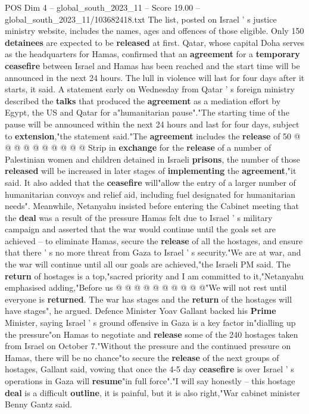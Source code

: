 \begin{textsample}{POS Dim 4 – global\_south\_2023\_11 – Score 19.00 – global\_south\_2023\_11/103682418.txt}
The list, posted on Israel ' s justice ministry website, includes the names, ages and offences of those eligible.
Only 150 \textbf{detainees} are expected to be \textbf{released} at first.
Qatar, whose capital Doha serves as the headquarters for Hamas, confirmed that an \textbf{agreement} for a \textbf{temporary} \textbf{ceasefire} between Israel and Hamas has been reached and the start time will be announced in the next 24 hours.
The lull in violence will last for four days after it starts, it said.
A statement early on Wednesday from Qatar ' s foreign ministry described the \textbf{talks} that produced the \textbf{agreement} as a mediation effort by Egypt, the US and Qatar for a"humanitarian pause"."The starting time of the pause will be announced within the next 24 hours and last for four days, subject to \textbf{extension},"the statement said."The \textbf{agreement} includes the \textbf{release} of 50 @ @ @ @ @ @ @ @ @ @ Strip in \textbf{exchange} for the \textbf{release} of a number of Palestinian women and children detained in Israeli \textbf{prisons}, the number of those \textbf{released} will be increased in later stages of \textbf{implementing} the \textbf{agreement},"it said.
It also added that the \textbf{ceasefire} will"allow the entry of a larger number of humanitarian convoys and relief aid, including fuel designated for humanitarian needs".
Meanwhile, Netanyahu insisted before entering the Cabinet meeting that the \textbf{deal} was a result of the pressure Hamas felt due to Israel ' s military campaign and asserted that the war would continue until the goals set are achieved -- to eliminate Hamas, secure the \textbf{release} of all the hostages, and ensure that there ' s no more threat from Gaza to Israel ' s security."We are at war, and the war will continue until all our goals are achieved,"the Israeli PM said.
The \textbf{return} of hostages is a top,"sacred priority and I am committed to it,"Netanyahu emphasised adding,"Before us @ @ @ @ @ @ @ @ @ @"We will not rest until everyone is \textbf{returned}.
The war has stages and the \textbf{return} of the hostages will have stages", he argued.
Defence Minister Yoav Gallant backed his \textbf{Prime} Minister, saying Israel ' s ground offensive in Gaza is a key factor in"dialling up the pressure"on Hamas to negotiate and \textbf{release} some of the 240 hostages taken from Israel on October 7."Without the pressure and the continued pressure on Hamas, there will be no chance"to secure the \textbf{release} of the next groups of hostages, Gallant said, vowing that once the 4-5 day \textbf{ceasefire} is over Israel ' s operations in Gaza will \textbf{resume}"in full force"."I will say honestly -- this hostage \textbf{deal} is a difficult \textbf{outline}, it is painful, but it is also right,"War cabinet minister Benny Gantz said.

\end{textsample}

